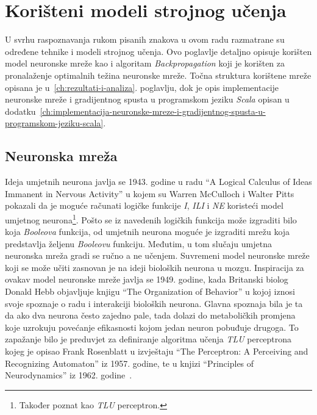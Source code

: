 \chapter{Korišteni modeli strojnog učenja}
\label{ch:koristeni-modeli-strojnog-ucenja}
U svrhu raspoznavanja rukom pisanih znakova u ovom radu razmatrane su određene tehnike i modeli strojnog učenja. Ovo
poglavlje detaljno opisuje korišten model neuronske mreže kao i algoritam \emph{Backpropagation} koji je korišten za
pronalaženje optimalnih težina neuronske mreže. Točna struktura korištene mreže opisana je
u\ \ref{ch:rezultati-i-analiza}. poglavlju, dok je opis implementacije neuronske mreže i gradijentnog spusta u
programskom jeziku \emph{Scala} opisan u
dodatku\ \ref{ch:implementacija-neuronske-mreze-i-gradijentnog-spusta-u-programskom-jeziku-scala}.


\section{Neuronska mreža}
\label{sec:neuronska-mreza}
Ideja umjetnih neurona javlja se 1943. godine u radu ``A Logical Calculus of Ideas Immanent in Nervous Activity'' u
kojem su Warren McCulloch i Walter Pitts pokazali da je moguće računati logičke funkcije \emph{I}, \emph{ILI} i
\emph{NE} koristeći model umjetnog neurona\footnote{Također poznat kao \emph{TLU} perceptron.}. Pošto se iz navedenih
logičkih funkcija može izgraditi bilo koja \emph{Booleova} funkcija, od umjetnih neurona moguće je izgraditi mrežu koja
predstavlja željenu \emph{Booleovu} funkciju. Međutim, u tom slučaju umjetna neuronska mreža gradi se ručno a ne
učenjem. Suvremeni model neuronske mreže koji se može učiti zasnovan je na ideji bioloških neurona u mozgu. Inspiracija
za ovakav model neuronske mreže javlja se 1949. godine, kada Britanski biolog Donald Hebb objavljuje knjigu
``The Organization of Behavior'' u kojoj iznosi svoje spoznaje o radu i interakciji bioloških neurona. Glavna spoznaja
bila je ta da ako dva neurona često zajedno pale, tada dolazi do metaboličkih promjena koje uzrokuju povećanje
efikasnosti kojom jedan neuron pobuđuje drugoga. To zapažanje bilo je preduvjet za definiranje algoritma učenja
\emph{TLU} perceptrona kojeg je opisao Frank Rosenblatt u izvještaju
``The Perceptron: A Perceiving and Recognizing Automaton'' iz 1957. godine, te u knjizi ``Principles of Neurodynamics''
iz 1962. godine\ \citep{cupic2013}.

